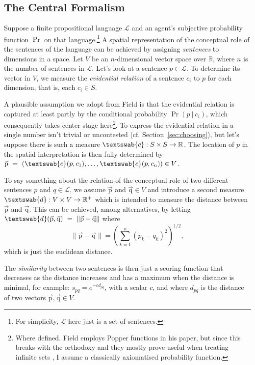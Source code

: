 \documentclass[11pt, a4paper]{scrartcl}
\renewcommand{\i}[1]{\emph{#1}}
\renewcommand{\L}{\mathcal{L}}
\renewcommand{\v}[1]{\vec{\mathrm{#1}}}
\newcommand{\m}[1]{\textswab{#1}}
\newcommand{\given}[1][]{\:#1\vert\:}
\begin{document}
\subsection{The Central Formalism}\label{sec:central}

Suppose a finite propositional language $\L$ and an agent's subjective probability function $\Pr$ on that language.\footnote{For simplicity, $\L$ here just is a set of sentences.} A spatial representation of the conceptual role of the sentences of the language can be achieved by assigning \i{sentences} to dimensions in a space. Let $V$ be an $n$-dimensional vector space over $\mathbb{R}$, where $n$ is the number of sentences in $\L$. Let's look at a sentence $p \in \L$. To determine its vector in $V$, we measure the \i{evidential relation} of a sentence $c_i$ to $p$ for each dimension, that is, each $c_i \in S$. 

A plausible assumption we adopt from Field is that the evidential relation is captured at least partly by the conditional probability $\Pr(p \given c_i)$, which consequently takes center stage here\footnote{Where defined. Field employs Popper functions in his paper, but since this breaks with the orthodoxy and they mostly prove useful when treating infinite sets \parencite[1352]{Leitgeb2013-LEIRBS}, I assume a classically axiomatised probability function.}. To express the evidential relation in a single number isn't trivial or uncontested (cf. Section~\ref{sec:choosing}), but let's suppose there is such a measure $\m{c}: S \times S \rightarrow \mathbb{R}$. The location of $p$ in the spatial interpretation is then fully determined by $\v{p}~=~(\m{c}({p, c_1}),\dots, \m{c}(p, c_n)) \in V$.

To say something about the relation of the conceptual role of two different sentences $p$ and $q \in \L$, we assume $\v{p}$ and $\v{q} \in V$ and introduce a second measure $\m{d}: V \times V \rightarrow \mathbb{R}^+$ which is intended to measure the distance between $\v{p}$ and $\v{q}$. This can be achieved, among alternatives, by letting ${\m{d}(\v{p}, \v{q})~=~\lVert \v{p} - \v{q} \rVert}$ where 
\[
    \lVert \v{p}-\v{q} \rVert = {\left( \sum_{k=1}^n {(p_k-q_k)}^2 \right)}^{1/2}, 
\]
which is just the euclidean distance. 

The \i{similarity} between two sentences is then just a scoring function that decreases as the distance increases and has a maximum when the distance is minimal, for example: $s_{pq} = e^{-cd_{pq}}$, with a scalar $c$, and where $d_{pq}$ is the distance of two vectors $\v{p}, \v{q} \in V$. 
\end{document}
